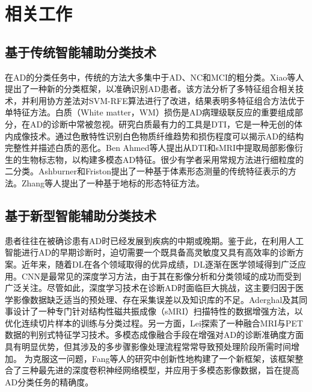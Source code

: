\section{相关工作}\label{chapter4.2}

\subsection{基于传统智能辅助分类技术}
在AD的分类任务中，传统的方法大多集中于AD、NC和MCI的粗分类\cite{payan2015predicting}。Xiao等人\cite{xiao2017brain}提出了一种新的分类框架，以准确识别AD患者。该方法分析了多特征组合相关技术，并利用协方差法对SVM-RFE算法进行了改进，结果表明多特征组合方法优于单特征方法。白质（White matter，WM）损伤是AD病理级联反应的重要组成部分，在AD的诊断中常被忽视\cite{rathore2017review}。研究白质最有力的工具是DTI，它是一种无创的体内成像技术。通过色散特性识别白色物质纤维趋势和损伤程度可以揭示AD的结构完整性并描述白质的恶化\cite{horgusluoglu2020systems}。Ben Ahmed等人\cite{ahmed2017recognition}提出从DTI和sMRI中提取局部影像衍生的生物标志物，以构建多模态AD特征。很少有学者采用常规方法进行细粒度的二分类\cite{prasad2015brain}。Ashburner和Friston\cite{ashburner2000voxel}提出了一种基于体素形态测量的传统特征表示的方法。Zhang等人\cite{zhang2016detecting}提出了一种基于地标的形态特征方法。

\subsection{基于新型智能辅助分类技术}
患者往往在被确诊患有AD时已经发展到疾病的中期或晚期。鉴于此，在利用人工智能进行AD的早期诊断时，迫切需要一个既具备高灵敏度又具有高效率的诊断方案\cite{shehata2018computer,bringas2020alzheimer,liu2018joint}。近年来，随着DL在各个领域取得的优异成绩，DL逐渐在医学领域得到广泛应用。CNN是最常见的深度学习方法，由于其在影像分析和分类领域的成功而受到广泛关注\cite{golla2020convolutional,liang2021cameranet}。尽管如此，深度学习技术在诊断AD时面临巨大挑战，这主要归因于医学影像数据缺乏适当的预处理、存在采集误差以及知识库的不足。Aderghal及其同事\cite{aderghal2017classification}设计了一种专门针对结构性磁共振成像（sMRI）扫描特性的数据增强方法，以优化连续切片样本的训练与分类过程。另一方面，Lei\cite{lei2016discriminative}探索了一种融合MRI与PET数据的判别式特征学习技术。多模态成像融合手段在增强对AD的诊断准确度方面具有明显优势，但其涉及的多步骤影像处理流程常常导致预处理阶段所需时间增加。
为克服这一问题，Fang等人的研究\cite{fang2020ensemble}中创新性地构建了一个新框架，该框架整合了三种最先进的深度卷积神经网络模型，并应用于多模态影像数据，旨在提高AD分类任务的精确度。


